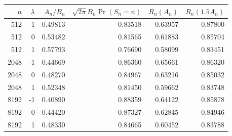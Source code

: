 \begin{tabular}{rrrrrr}
\toprule
$n$ & $\lambda$ & $A_n/B_n$ & $\sqrt{2\pi}B_n\Pr(S_n=n)$ & $R_n(A_n)$ & $R_n(1.5A_n)$\\
\midrule
512 & -1 & 0.49813 & 0.83518 & 0.63957 & 0.87800 \\
512 & 0 & 0.53482 & 0.81565 & 0.61883 & 0.85704 \\
512 & 1 & 0.57793 & 0.76690 & 0.58099 & 0.83451 \\
2048 & -1 & 0.44669 & 0.86360 & 0.65661 & 0.86320 \\
2048 & 0 & 0.48270 & 0.84967 & 0.63216 & 0.85032 \\
2048 & 1 & 0.52348 & 0.81450 & 0.59662 & 0.83748 \\
8192 & -1 & 0.40890 & 0.88359 & 0.64122 & 0.85878 \\
8192 & 0 & 0.44420 & 0.87327 & 0.62845 & 0.84946 \\
8192 & 1 & 0.48330 & 0.84665 & 0.60452 & 0.83788 \\
\bottomrule
\end{tabular}
